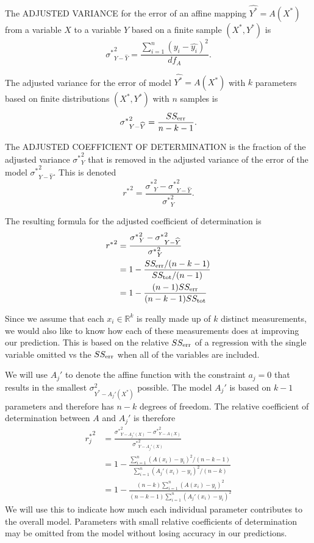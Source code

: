 \begin{definition}
    The ADJUSTED VARIANCE for the error of an affine mapping $\widehat{Y^*}=A(X^*)$ from a variable $X$ to a variable $Y$ based on a finite sample $(X^*,Y^*)$ is
    $${\sigma^*}^2_{Y-\widehat{Y}}=\frac{\sum_{i=1}^n(y_i-\widehat{y_i})^2}{df_A}.$$
\end{definition}

The adjusted variance for the error of model $\widehat{Y^*}=A(X^*)$ with $k$ parameters based on finite distributions $(X^*,Y^*)$ with $n$ samples is
$${\sigma^*}_{Y-\widehat{Y}}^2=\frac{SS_{\text{err}}}{n-k-1}.$$

\begin{definition}
    The ADJUSTED COEFFICIENT OF DETERMINATION is the fraction of the adjusted variance ${\sigma^*}^2_Y$ that is removed in the adjusted variance of the error of the model ${\sigma^*}_{Y-\widehat{Y}}^2$. This is denoted
    $${r^*}^2=\frac{{\sigma^*}^2_Y-{\sigma^*}_{Y-\widehat{Y}}^2}{{\sigma^*}^2_Y}.$$
\end{definition}
The resulting formula for the adjusted coefficient of determination is
\begin{align*}
    {r^*}^2&=\frac{{\sigma^*}^2_Y-{\sigma^*}_{Y-\widehat{Y}}^2}{{\sigma^*}^2_Y}\\
    &=1-\frac{SS_{\text{err}}/(n-k-1)}{SS_{\text{tot}}/(n-1)}\\
    &=1-\frac{(n-1)SS_{\text{err}}}{(n-k-1)SS_{\text{tot}}}
\end{align*}

Since we assume that each $x_i\in\mathbb{R}^k$ is really made up of $k$ distinct measurements, we would also like to know how each of these measurements does at improving our prediction. This is based on the relative $SS_{\text{err}}$ of a regression with the single variable omitted vs the $SS_{\text{err}}$ when all of the variables are included. 

We will use $A_j'$ to denote the affine function with the constraint $a_j=0$ that results in the smallest $\sigma_{Y^*-A_j'(X^*)}^2$ possible. The model $A_j'$ is based on $k-1$ parameters and therefore has $n-k$ degrees of freedom. The relative coefficient of determination between $A$ and $A_j'$ is therefore
\begin{align*}
{r_j^*}^2&=\frac{{\sigma^*}^2_{Y-A_j'(X)}-{\sigma^*}^2_{Y-A(X)}}{{\sigma^*}^2_{Y-A_j'(X)}}\\
    &=1-\frac{\sum_{i=1}^n(A(x_i)-y_i)^2/(n-k-1)}{\sum_{i=1}^n(A_j'(x_i)-y_i)^2/(n-k)}\\
    &=1-\frac{(n-k)\sum_{i=1}^n(A(x_i)-y_i)^2}{(n-k-1)\sum_{i=1}^n(A_j'(x_i)-y_i)^2}
\end{align*}
We will use this to indicate how much each individual parameter contributes to the overall model. Parameters with small relative coefficients of determination may be omitted from the model without losing accuracy in our predictions.
